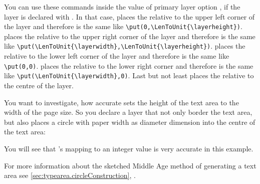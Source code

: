 \begin{Declaration}
\end{Declaration}
You can use these commands inside the
value of primary layer option , if the layer is declared with
. In that case,  places the
 relative to the upper left corner of the layer and therefore
is the same like
\lstinline[breaklines=false]|\put(0,\LenToUnit{\layerheight})|. 
places the  relative to the upper right corner of the layer and
therefore is the same like
\lstinline[breaklines=false]|\put(\LenToUnit{\layerwidth},\LenToUnit{\layerheight})|.
 places the  relative to the lower left corner of
the layer and therefore is the same like
\lstinline[breaklines=false]|\put(0,0)|.  places the
 relative to the lower right corner and therefore is the same
like \lstinline[breaklines=false]|\put(\LenToUnit{\layerwidth},0)|. Last but
not least  places the  relative to the centre of
the layer.%
\begin{Example}
  You want to investigate, how accurate
   sets the height of the text area to
  the width of the page size. So you declare a layer that not only border the
  text area, but also places a circle with paper width as diameter dimension
  into the centre of the text area:
  You will see that 's mapping to an integer 
  value is very accurate in this example.
\end{Example}
For more information about the sketched Middle Age method of generating a text
area see \autoref{sec:typearea.circleConstruction},
.

